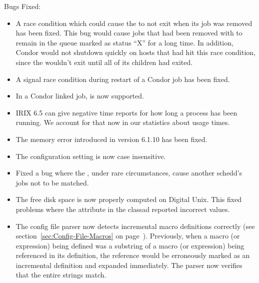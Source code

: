 \noindent Bugs Fixed:

\begin{itemize}

\item A race condition which could cause the  to not
exit when its job was removed has been fixed.
This bug would cause jobs that had been removed with  to
remain in the queue marked as status ``X'' for a long time.
In addition, Condor would not shutdown quickly on hosts that had hit
this race condition, since the  wouldn't exit until all
of its  children had exited.

\item A signal race condition during restart of a Condor job has
been fixed.

\item In a Condor linked job,  is now
supported. 

\item IRIX 6.5 can give negative time reports for how long a process has been
running. We account for that now in our statistics about usage times.

\item The  memory error introduced in version 6.1.10
has been fixed.

\item The  configuration setting is now case
insensitive.

\item Fixed a bug where the , under rare circumstances,
cause another schedd's jobs not to be matched.

\item The free disk space is now properly computed on Digital Unix.
This fixed problems where the  attribute in the
 classad reported incorrect values.

\item The config file parser now detects incremental macro definitions
correctly (see section~\ref{sec:Config-File-Macros} on
page~\pageref{sec:Config-File-Macros}).  Previously, when a macro (or
expression) being defined was a substring of a macro (or expression)
being referenced in its definition, the reference would be erroneously
marked as an incremental definition and expanded immediately.  The
parser now verifies that the entire strings match.

\end{itemize}

